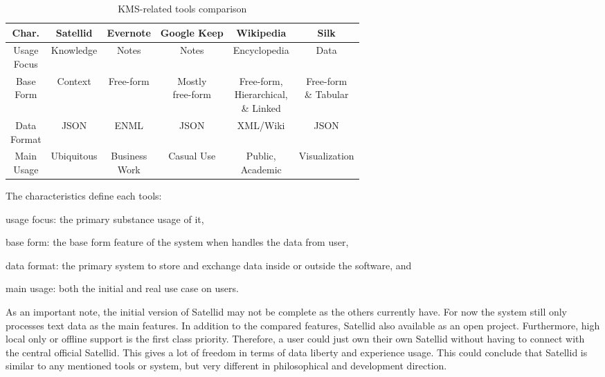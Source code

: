 \begin{table}[h!]
\centering
\begin{tabular}{ |c||c|c|c|c|c| }
\hline
Char.  & Satellid   & Evernote      & Google Keep & Wikipedia    & Silk \\ \hline
\hline
\shortstack{Usage\\Focus} & Knowledge  & Notes         & Notes       & Encyclopedia & Data \\ \hline
\shortstack{Base\\Form}   & Context    & Free-form     & \shortstack{Mostly\\free-form} & \shortstack{Free-form,\\Hierarchical,\\\& Linked} & \shortstack{Free-form\\\& Tabular} \\ \hline
\shortstack{Data\\Format} & JSON       & ENML          & JSON        & XML/Wiki     & JSON \\ \hline
\shortstack{Main\\Usage} & Ubiquitous & \shortstack{Business\\Work} & Casual Use  & \shortstack{Public,\\Academic} & Visualization \\
\hline
\end{tabular}
\caption{KMS-related tools comparison}
\label{table:kms-comparison}
\end{table}

The characteristics define each tools:
\begin{inparaenum}[\itshape 1\upshape)]
\item usage focus: the primary substance usage of it,
\item base form: the base form feature of the system when handles the data from user,
\item data format: the primary system to store and exchange data inside or outside the software, and
\item main usage: both the initial and real use case on users.
\end{inparaenum}
As an important note, the initial version of Satellid may not be complete as the others currently have.
For now the system still only processes text data as the main features.
In addition to the compared features, Satellid also available as an open project.
Furthermore, high local only or offline support is the first class priority.
Therefore, a user could just own their own Satellid without having to connect with the central official Satellid.
This gives a lot of freedom in terms of data liberty and experience usage.
This could conclude that Satellid is similar to any mentioned tools or system, but very different in philosophical and development direction.
